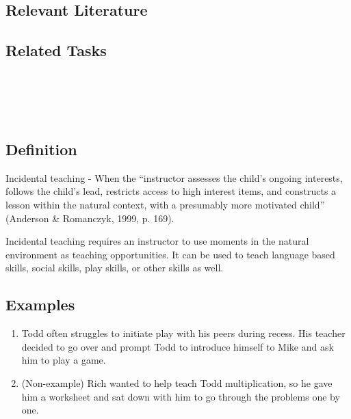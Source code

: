 \subsection{Relevant Literature}
\begin{refsection}
\nocite{test,alang2017police,clayton2018black}
\printbibliography[heading=none]
\end{refsection}
%
\subsection{Related Tasks}
\fourfOne{}\\
\fourfFour{}\\
\fourjFourteen{}\\
%
%
%
%
%
%
\section{\fourfSix{}}
\subsection{Definition}
Incidental teaching - When the ``instructor assesses the child's ongoing interests, follows the child's lead, restricts access to high interest items, and constructs a lesson within the natural context, with a presumably more motivated child'' (Anderson \& Romanczyk, 1999, p. 169).

Incidental teaching requires an instructor to use moments in the natural environment as teaching opportunities. It can be used to teach language based skills, social skills, play skills, or other skills as well.

\subsection{Examples}
\begin{enumerate}
\item Todd often struggles to initiate play with his peers during recess. His teacher decided to go over and prompt Todd to introduce himself to Mike and ask him to play a game. 
\item (Non-example) Rich wanted to help teach Todd multiplication, so he gave him a worksheet and sat down with him to go through the problems one by one.
\end{enumerate}
%
